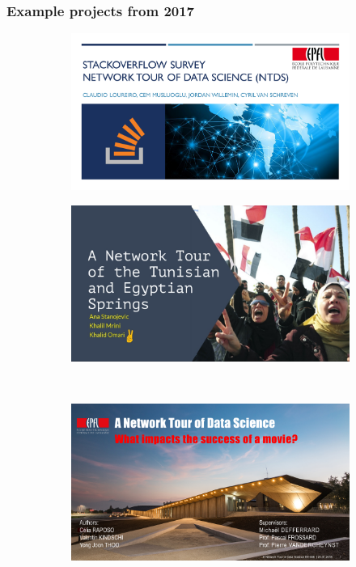 \documentclass[aspectratio=169]{beamer}
\begin{document}
\begin{frame}
	\frametitle{Example projects from 2017}
	\begin{figure}
		\centering
		\begin{subfigure}[b]{0.47\linewidth}
			\includegraphics[width=\linewidth]{project2017_stackoverflow}
		\end{subfigure}
		\hfill
		\begin{subfigure}[b]{0.47\linewidth}
			\includegraphics[width=\linewidth]{project2017_springs}
		\end{subfigure}
		\\
		\vspace{0.5em}
		\begin{subfigure}[b]{0.47\linewidth}
			\includegraphics[width=\linewidth]{project2017_movies}

\end{subfigure}
\end{figure}
\end{frame}
\end{document}
